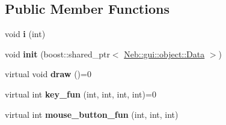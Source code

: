 \subsection*{\-Public \-Member \-Functions}
\begin{DoxyCompactItemize}
\item 
\hypertarget{classNeb_1_1gui_1_1object_1_1object_a006afaeceb89f8feb38bdadee1de8ab6}{void {\bfseries i} (int)}\label{classNeb_1_1gui_1_1object_1_1object_a006afaeceb89f8feb38bdadee1de8ab6}

\item 
\hypertarget{classNeb_1_1gui_1_1object_1_1object_a39ca9639066cf04093ae6992e487c37c}{void {\bfseries init} (boost\-::shared\-\_\-ptr$<$ \hyperlink{classNeb_1_1gui_1_1object_1_1Data}{\-Neb\-::gui\-::object\-::\-Data} $>$)}\label{classNeb_1_1gui_1_1object_1_1object_a39ca9639066cf04093ae6992e487c37c}

\item 
\hypertarget{classNeb_1_1gui_1_1object_1_1object_a65370ca04d6db98318170c5ee937cf7e}{virtual void {\bfseries draw} ()=0}\label{classNeb_1_1gui_1_1object_1_1object_a65370ca04d6db98318170c5ee937cf7e}

\item 
\hypertarget{classNeb_1_1gui_1_1object_1_1object_aa227fe7547b26a5620db7a1f7daaa455}{virtual int {\bfseries key\-\_\-fun} (int, int, int, int)=0}\label{classNeb_1_1gui_1_1object_1_1object_aa227fe7547b26a5620db7a1f7daaa455}

\item 
\hypertarget{classNeb_1_1gui_1_1object_1_1object_a9fe2709890ef4285fbfebec5b117eb6f}{virtual int {\bfseries mouse\-\_\-button\-\_\-fun} (int, int, int)}\label{classNeb_1_1gui_1_1object_1_1object_a9fe2709890ef4285fbfebec5b117eb6f}

\end{DoxyCompactItemize}
